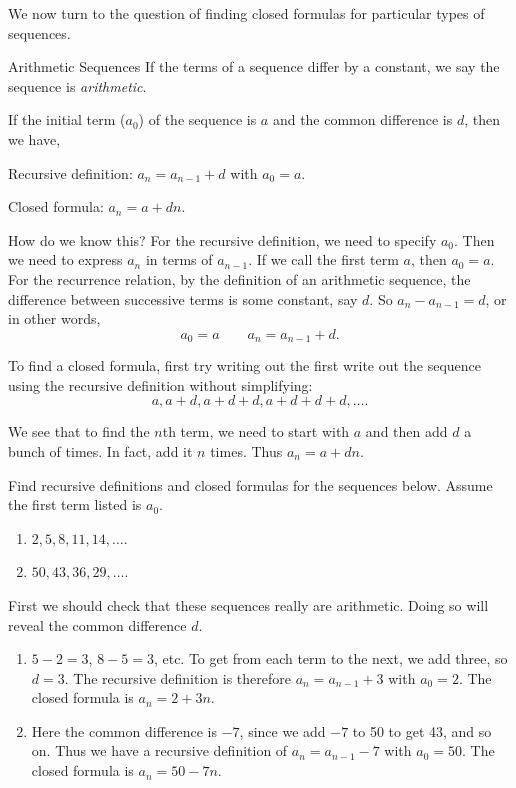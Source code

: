 \documentclass[12pt]{article}
\begin{document}
We now turn to the question of finding closed formulas for particular types of sequences.

\begin{defbox}{Arithmetic Sequences}
  If the terms of a sequence differ by a constant, we say the sequence is {\em arithmetic}.

  If the initial term ($a_0$) of the sequence is $a$ and the common difference is $d$, then we have,

  Recursive definition: $a_n = a_{n-1} + d$ with $a_0 = a$.

  Closed formula: $a_n = a + dn$.
\end{defbox}

How do we know this? For the recursive definition, we need to specify $a_0$.  Then we need to express $a_n$ in terms of $a_{n-1}$.  If we call the first term $a$, then $a_0 = a$.  For the recurrence relation, by the definition of an arithmetic sequence, the difference between successive terms is some constant, say $d$.  So $a_n - a_{n-1} = d$, or in other words, \[ a_0 = a \qquad a_n=a_{n-1}+d.\]

To find a closed formula, first try writing out the first write out the sequence using the recursive definition without simplifying:
\[a, a+d, a+d+d, a+d+d+d, \ldots.\]

We see that to find the $n$th term, we need to start with $a$ and then add $d$ a bunch of times. In fact, add it $n$ times.  Thus $a_n = a+dn$.

\begin{example}
  Find recursive definitions and closed formulas for the sequences below.  Assume the first term listed is $a_0$.
  \begin{enumerate}
  \item $2, 5, 8, 11, 14, \ldots$.
    \item $50, 43, 36, 29, \ldots$.

  \end{enumerate}
  \begin{solution}
  First we should check that these sequences really are arithmetic.  Doing so will reveal the common difference $d$.
    \begin{enumerate}
      \item $5-2 = 3$, $8-5 = 3$, etc.  To get from each term to the next, we add three, so $d = 3$.  The recursive definition is therefore $a_n = a_{n-1} + 3$ with $a_0 = 2$.  The closed formula is $a_n = 2 + 3n$.
      \item Here the common difference is $-7$, since we add $-7$ to 50 to get 43, and so on.  Thus we have a recursive definition of $a_n = a_{n-1} - 7$ with $a_0 = 50$.  The closed formula is $a_n = 50 - 7n$.
    \end{enumerate}

  \end{solution}

\end{example}
\end{document}
